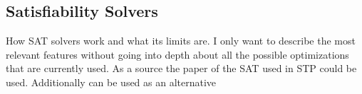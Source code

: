 \subsection{Satisfiability Solvers}
How SAT solvers work and what its limits are.
I only want to describe the most relevant features without going into depth about all the possible optimizations that are currently used.
As a source the paper of the SAT used in STP \cite{10.1007/978-3-540-24605-3_37} could be used. Additionally \cite{Gomes2008SatisfiabilityS} can be used as an alternative